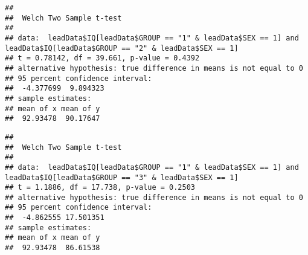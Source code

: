 \documentclass[
]{article}
\newenvironment{Shaded}{\begin{snugshade}}{\end{snugshade}}
\newcommand{\DataTypeTok}[1]{\textcolor[rgb]{0.13,0.29,0.53}{#1}}
\newcommand{\DecValTok}[1]{\textcolor[rgb]{0.00,0.00,0.81}{#1}}
\newcommand{\KeywordTok}[1]{\textcolor[rgb]{0.13,0.29,0.53}{\textbf{#1}}}
\newcommand{\NormalTok}[1]{#1}
\newcommand{\OperatorTok}[1]{\textcolor[rgb]{0.81,0.36,0.00}{\textbf{#1}}}
\newcommand{\StringTok}[1]{\textcolor[rgb]{0.31,0.60,0.02}{#1}}
\begin{document}
\begin{verbatim}
## 
##  Welch Two Sample t-test
## 
## data:  leadData$IQ[leadData$GROUP == "1" & leadData$SEX == 1] and leadData$IQ[leadData$GROUP == "2" & leadData$SEX == 1]
## t = 0.78142, df = 39.661, p-value = 0.4392
## alternative hypothesis: true difference in means is not equal to 0
## 95 percent confidence interval:
##  -4.377699  9.894323
## sample estimates:
## mean of x mean of y 
##  92.93478  90.17647
\end{verbatim}

\begin{Shaded}
\end{Shaded}

\begin{verbatim}
## 
##  Welch Two Sample t-test
## 
## data:  leadData$IQ[leadData$GROUP == "1" & leadData$SEX == 1] and leadData$IQ[leadData$GROUP == "3" & leadData$SEX == 1]
## t = 1.1886, df = 17.738, p-value = 0.2503
## alternative hypothesis: true difference in means is not equal to 0
## 95 percent confidence interval:
##  -4.862555 17.501351
## sample estimates:
## mean of x mean of y 
##  92.93478  86.61538
\end{verbatim}

\begin{Shaded}
\end{Shaded}
\end{document}

